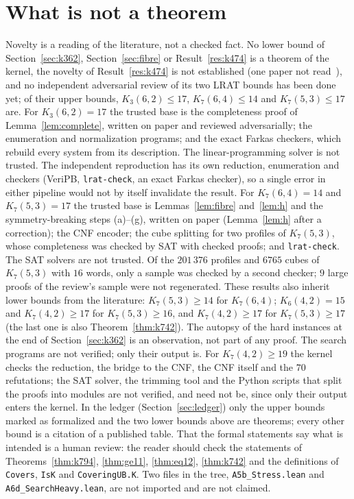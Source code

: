 \documentclass[11pt]{amsart}
\theoremstyle{definition}
\theoremstyle{remark}
\begin{document}
\section{What is not a theorem}
Novelty is a reading of the literature, not a checked fact.
No lower bound of Section~\ref{sec:k362}, Section~\ref{sec:fibre} or Result~\ref{res:k474} is a theorem of the kernel, the novelty of Result~\ref{res:k474} is not established (one paper not read~\cite{haas2011}), and no independent adversarial review of its two LRAT bounds has been done yet; of their upper bounds, $K_3(6,2)\le 17$, $K_7(6,4)\le 14$ and $K_7(5,3)\le 17$ are.
For $K_3(6,2)=17$ the trusted base is the completeness proof of Lemma~\ref{lem:complete}, written on paper and reviewed adversarially; the enumeration and normalization programs; and the exact Farkas checkers, which rebuild every system from its description. The linear-programming solver is not trusted. The independent reproduction has its own reduction, enumeration and checkers (VeriPB, \texttt{lrat-check}, an exact Farkas checker), so a single error in either pipeline would not by itself invalidate the result.
For $K_7(6,4)=14$ and $K_7(5,3)=17$ the trusted base is Lemmas~\ref{lem:fibre} and~\ref{lem:h} and the symmetry-breaking steps (a)--(g), written on paper (Lemma~\ref{lem:h} after a correction); the CNF encoder; the cube splitting for two profiles of $K_7(5,3)$, whose completeness was checked by SAT with checked proofs; and \texttt{lrat-check}. The SAT solvers are not trusted. Of the $201\,376$ profiles and $6765$ cubes of $K_7(5,3)$ with $16$ words, only a sample was checked by a second checker; $9$ large proofs of the review's sample were not regenerated.
These results also inherit lower bounds from the literature: $K_7(5,3)\ge 14$ for $K_7(6,4)$; $K_6(4,2)=15$ and $K_7(4,2)\ge 17$ for $K_7(5,3)\ge 16$, and $K_7(4,2)\ge 17$ for $K_7(5,3)\ge 17$ (the last one is also Theorem~\ref{thm:k742}).
The autopsy of the hard instances at the end of Section~\ref{sec:k362} is an observation, not part of any proof.
The search programs are not verified; only their output is.
For $K_7(4,2)\ge 19$ the kernel checks the reduction, the bridge to the CNF, the CNF itself and the $70$ refutations; the SAT solver, the trimming tool and the Python scripts that split the proofs into modules are not verified, and need not be, since only their output enters the kernel.
In the ledger (Section~\ref{sec:ledger}) only the upper bounds marked as formalized and the two lower bounds above are theorems; every other bound is a citation of a published table.
That the formal statements say what is intended is a human review: the reader should check the statements of Theorems~\ref{thm:k794}, \ref{thm:ge11}, \ref{thm:eq12}, \ref{thm:k742} and the definitions of \texttt{Covers}, \texttt{IsK} and \texttt{CoveringUB.\allowbreak K}.
Two files in the tree, \texttt{A5b\_\allowbreak Stress.\allowbreak lean} and \texttt{A6d\_\allowbreak SearchHeavy.\allowbreak lean}, are not imported and are not claimed.
\end{document}

